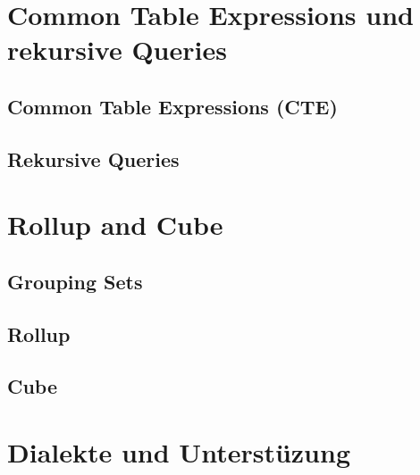 \section{Common Table Expressions und rekursive Queries}

\subsection{Common Table Expressions (CTE)}

\subsection{Rekursive Queries}

\section{Rollup and Cube}

\subsection{Grouping Sets}

\subsection{Rollup}

\subsection{Cube}

\section{Dialekte und Unterstüzung}